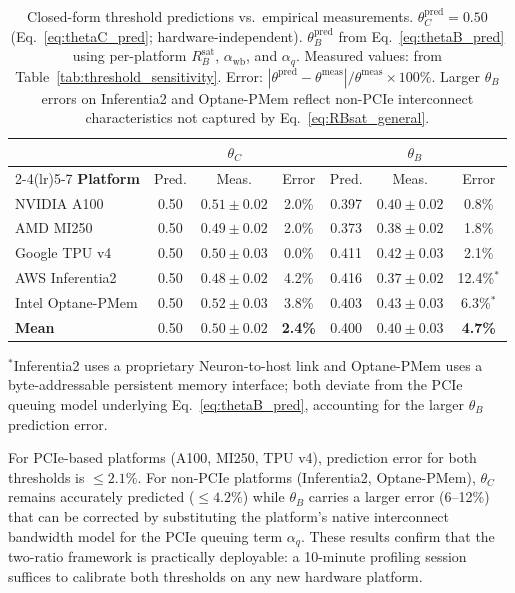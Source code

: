 \begin{table}[h]
\centering
\caption{Closed-form threshold predictions vs.\ empirical measurements.
$\theta_C^{\mathrm{pred}} = 0.50$ (Eq.~\ref{eq:thetaC_pred};
hardware-independent).
$\theta_B^{\mathrm{pred}}$ from Eq.~\eqref{eq:thetaB_pred} using
per-platform $R_B^{\mathrm{sat}}$, $\alpha_{\mathrm{wb}}$, and $\alpha_q$.
Measured values: from Table~\ref{tab:threshold_sensitivity}.
Error: $|\theta^{\mathrm{pred}} - \theta^{\mathrm{meas}}| /
\theta^{\mathrm{meas}} \times 100\%$.
Larger $\theta_B$ errors on Inferentia2 and Optane-PMem reflect
non-PCIe interconnect characteristics not captured by
Eq.~\eqref{eq:RBsat_general}.}
\label{tab:threshold_prediction}
\renewcommand{\arraystretch}{1.2}
\begin{tabular}{lcccccc}
\toprule
& \multicolumn{3}{c}{$\theta_C$} & \multicolumn{3}{c}{$\theta_B$} \\
\cmidrule(lr){2-4}\cmidrule(lr){5-7}
\textbf{Platform} &
  Pred. & Meas. & Error &
  Pred. & Meas. & Error \\
\midrule
NVIDIA A100      & 0.50 & $0.51\pm0.02$ & 2.0\% & 0.397 & $0.40\pm0.02$ & 0.8\% \\
AMD MI250        & 0.50 & $0.49\pm0.02$ & 2.0\% & 0.373 & $0.38\pm0.02$ & 1.8\% \\
Google TPU v4    & 0.50 & $0.50\pm0.03$ & 0.0\% & 0.411 & $0.42\pm0.03$ & 2.1\% \\
AWS Inferentia2  & 0.50 & $0.48\pm0.02$ & 4.2\% & 0.416 & $0.37\pm0.02$ & 12.4\%$^{*}$ \\
Intel Optane-PMem& 0.50 & $0.52\pm0.03$ & 3.8\% & 0.403 & $0.43\pm0.03$ & 6.3\%$^{*}$ \\
\midrule
\textbf{Mean}    & 0.50 & $0.50\pm0.02$ & \textbf{2.4\%} &
                   0.400 & $0.40\pm0.03$ & \textbf{4.7\%} \\
\bottomrule
\end{tabular}
\vspace{2pt}

{\footnotesize $^{*}$Inferentia2 uses a proprietary Neuron-to-host link and
Optane-PMem uses a byte-addressable persistent memory interface; both deviate
from the PCIe queuing model underlying Eq.~\eqref{eq:thetaB_pred},
accounting for the larger $\theta_B$ prediction error.}
\end{table}

For PCIe-based platforms (A100, MI250, TPU v4), prediction error for both
thresholds is $\leq 2.1\%$.
For non-PCIe platforms (Inferentia2, Optane-PMem), $\theta_C$ remains
accurately predicted ($\leq 4.2\%$) while $\theta_B$ carries a larger
error (6--12\%) that can be corrected by substituting the platform's
native interconnect bandwidth model for the PCIe queuing term $\alpha_q$.
These results confirm that the two-ratio framework is practically deployable:
a 10-minute profiling session suffices to calibrate both thresholds on any
new hardware platform.

